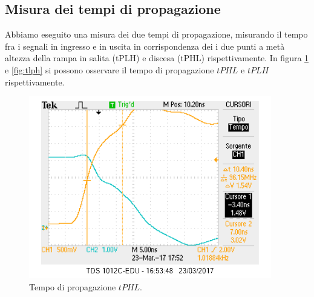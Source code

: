 \documentclass[10pt,a4paper]{article}
\begin{document}
\subsection{Misura dei tempi di propagazione}
Abbiamo eseguito una misura dei due tempi di propagazione, misurando il tempo fra i segnali in ingresso e in uscita in corrispondenza dei i due punti a metà altezza della rampa in salita (tPLH) e discesa (tPHL) rispettivamente.
In figura \ref{fig:tphl} e \ref{fig:tlph} si possono osservare il tempo di propagazione $tPHL$ e $tPLH$ rispettivamente.
\begin{figure}
\centering
\includegraphics[scale=0.6]{tphl(meglio).png}
\caption{Tempo di propagazione $tPHL$.\label{fig:tphl}}
\end{figure}
\end{document}
